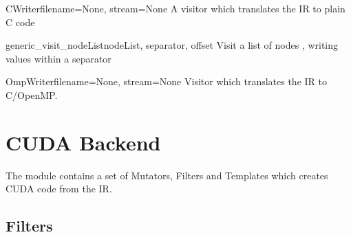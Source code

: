 \documentclass[a4paper,10pt,english]{manual}
\begin{document}
\hypertarget{Backends.CBackend.Writers.CWriter.CWriter}{}\begin{classdesc}{CWriter}{filename=None, stream=None}
A visitor which translates the IR to plain C code

\hypertarget{Backends.CBackend.Writers.CWriter.CWriter.generic\_visit\_nodeList}{}\begin{methoddesc}{generic\_visit\_nodeList}{nodeList, separator, offset}
Visit a list of nodes , writing values within a separator
\end{methoddesc}
\end{classdesc}
\hypertarget{module-Backends.CBackend.Writers.OmpWriter}{}
\modulesynopsis{}

\hypertarget{Backends.CBackend.Writers.OmpWriter.OmpWriter}{}\begin{classdesc}{OmpWriter}{filename=None, stream=None}
Visitor which translates the IR to C/OpenMP.
\end{classdesc}

\resetcurrentobjects
\hypertarget{--doc-cudabackend}{}

\section{CUDA Backend}
\hypertarget{module-CudaBackend}{}
The \hyperlink{module-CudaBackend}{} module contains a set of Mutators, Filters and Templates
which creates CUDA code from the IR.


\subsection{Filters}
\hypertarget{module-Backends.CudaBackend.Visitors.CM_Visitors}{}
\modulesynopsis{}
\end{document}
